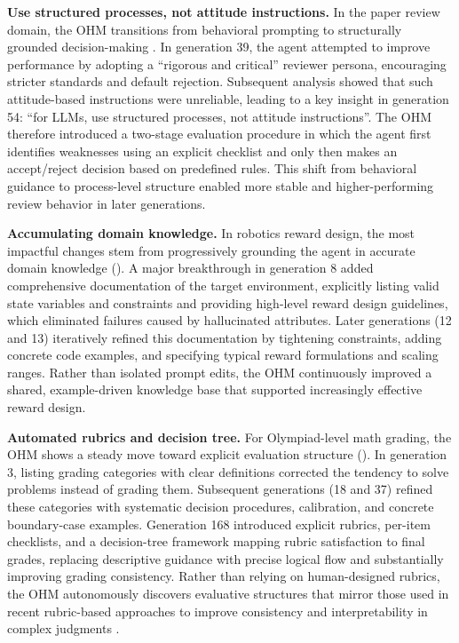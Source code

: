 \documentclass[]{fairmeta}
\begin{document}
\textbf{Use structured processes, not attitude instructions.} In the paper review domain, the OHM transitions from behavioral prompting to structurally grounded decision-making . In generation 39, the agent attempted to improve performance by adopting a ``rigorous and critical'' reviewer persona, encouraging stricter standards and default rejection. Subsequent analysis showed that such attitude-based instructions were unreliable, leading to a key insight in generation 54: ``for LLMs, use structured processes, not attitude instructions''. The OHM therefore introduced a two-stage evaluation procedure in which the agent first identifies weaknesses using an explicit checklist and only then makes an accept/reject decision based on predefined rules. This shift from behavioral guidance to process-level structure enabled more stable and higher-performing review behavior in later generations.

\textbf{Accumulating domain knowledge.} In robotics reward design, the most impactful changes stem from progressively grounding the agent in accurate domain knowledge (). A major breakthrough in generation 8 added comprehensive documentation of the target environment, explicitly listing valid state variables and constraints and providing high-level reward design guidelines, which eliminated failures caused by hallucinated attributes. Later generations (12 and 13) iteratively refined this documentation by tightening constraints, adding concrete code examples, and specifying typical reward formulations and scaling ranges. Rather than isolated prompt edits, the OHM continuously improved a shared, example-driven knowledge base that supported increasingly effective reward design.

\textbf{Automated rubrics and decision tree.} For Olympiad-level math grading, the OHM shows a steady move toward explicit evaluation structure (). In generation 3, listing grading categories with clear definitions corrected the tendency to solve problems instead of grading them. Subsequent generations (18 and 37) refined these categories with systematic decision procedures, calibration, and concrete boundary-case examples. Generation 168 introduced explicit rubrics, per-item checklists, and a decision-tree framework mapping rubric satisfaction to final grades, replacing descriptive guidance with precise logical flow and substantially improving grading consistency.
Rather than relying on human-designed rubrics, the OHM autonomously discovers evaluative structures that mirror those used in recent rubric-based approaches to improve consistency and interpretability in complex judgments \citep{cook2024ticking, fan2024sedareval, chen2026automated, lv2026rubrics}.
\end{document}
